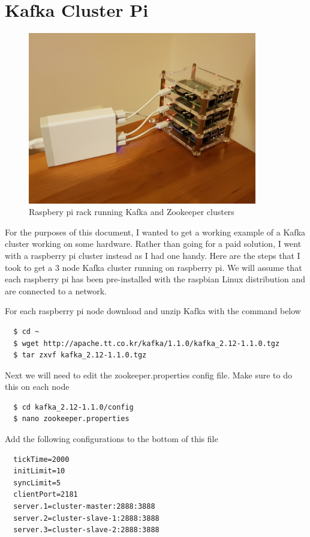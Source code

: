 \section{Kafka Cluster Pi}

\begin{figure}[H]
  \centering
  \includegraphics[scale=0.5,width=100mm]{./images/pi-cluster.jpg}
  \caption{Raspbery pi rack running Kafka and Zookeeper clusters}
  \label{fig:pi-rack}
\end{figure}

For the purposes of this document, I wanted to get a working example of a Kafka cluster working on some hardware. Rather than going for a paid solution, I went with a raspberry pi cluster instead as I had one handy. Here are the steps that I took to get a 3 node Kafka cluster running on raspberry pi. We will assume that each raspberry pi has been pre-installed with the raspbian Linux distribution and are connected to a network.

For each raspberry pi node download and unzip Kafka with the command below

\begin{verbatim}
  $ cd ~
  $ wget http://apache.tt.co.kr/kafka/1.1.0/kafka_2.12-1.1.0.tgz
  $ tar zxvf kafka_2.12-1.1.0.tgz
\end{verbatim}

Next we will need to edit the zookeeper.properties config file. Make sure to do this on each node

\begin{verbatim}
  $ cd kafka_2.12-1.1.0/config
  $ nano zookeeper.properties
\end{verbatim}

Add the following configurations to the bottom of this file

\begin{verbatim}
  tickTime=2000
  initLimit=10
  syncLimit=5
  clientPort=2181
  server.1=cluster-master:2888:3888
  server.2=cluster-slave-1:2888:3888
  server.3=cluster-slave-2:2888:3888
\end{verbatim}

